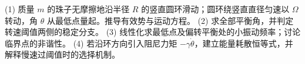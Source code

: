 (1) 质量 \(m\) 的珠子无摩擦地沿半径 \(R\) 的竖直圆环滑动；圆环绕竖直直径匀速以 \(\Omega\) 转动，角 \(\theta\) 从最低点量起。推导有效势与运动方程。
(2) 求全部平衡角，并判定转速阈值两侧的稳定分支。
(3) 线性化求最低点及偏转平衡处的小振动频率；讨论临界点的非谐性。
(4) 若沿环方向引入阻尼力矩 \(-\gamma\dot\theta\)，建立能量耗散恒等式，并解释慢速过阈值时的选择机制。
